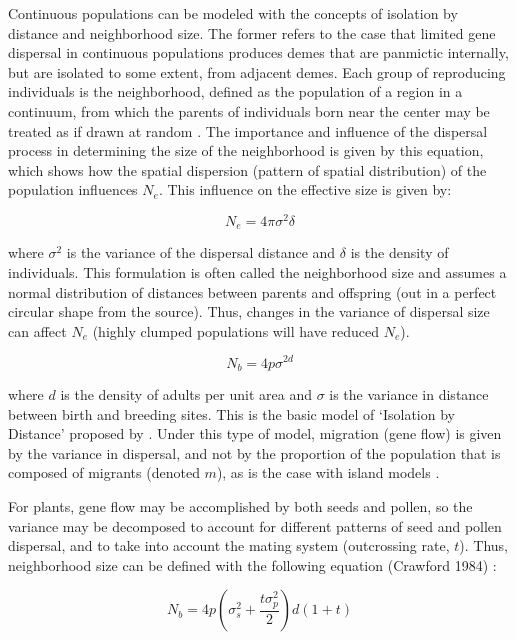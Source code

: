 \documentclass[a4paper, 12pt]{article}
\begin{document}
\begin{linenumbers}
Continuous populations can be modeled with the concepts of isolation by distance and neighborhood size\citep{Wright:1943aa,Wright:1946aa}. The former refers to the case that limited gene dispersal in continuous populations produces demes that are panmictic internally, but are isolated to some extent, from adjacent demes. Each group of reproducing individuals is the neighborhood, defined as the population of a region in a continuum, from which the parents of individuals born near the center may be treated as if drawn at random \citep{Wright:1969mb}. The importance and influence of the dispersal process in determining the size of the neighborhood is given by this equation, which shows how the spatial dispersion (pattern of spatial distribution) of the population influences $N_e$. This influence on the effective size is given by:

\begin{equation}
					N_e= 4 \pi \sigma^2 \delta
\end{equation}

where $\sigma^2$ is the variance of the dispersal distance and $\delta$ is the density of individuals. This formulation is often called the neighborhood size and assumes a normal distribution of distances  between parents and offspring (out in a perfect circular shape from the source). Thus, changes in the variance of dispersal size can affect $N_e$ (highly clumped populations will have reduced $N_e$). 

\begin{equation}
					N_b= 4p \sigma^{2d}
\end{equation}

where $d$ is the density of adults per unit area and $\sigma$ is the variance in distance between birth and breeding sites. This is the basic model of ‘Isolation by Distance’ proposed by   \citet{Wright:1943aa,Wright:1946aa}. Under this type of model, migration (gene flow) is given by the variance in dispersal, and not by the proportion of the population that is composed of migrants (denoted $m$), as is the case with island models \citep{Slatkin:1985qb}.

For plants, gene flow may be accomplished by both seeds and pollen, so the variance may be decomposed to account for different patterns of seed and pollen dispersal, and to take into account the mating system (outcrossing rate, $t$). Thus, neighborhood size can be defined with the following equation (Crawford 1984) :

\begin{equation}
  					N_b = 4p (\sigma^2_s + \frac{t \sigma^2_p}{2}) d (1 + t)
\end{equation}


\end{linenumbers}
\end{document}
